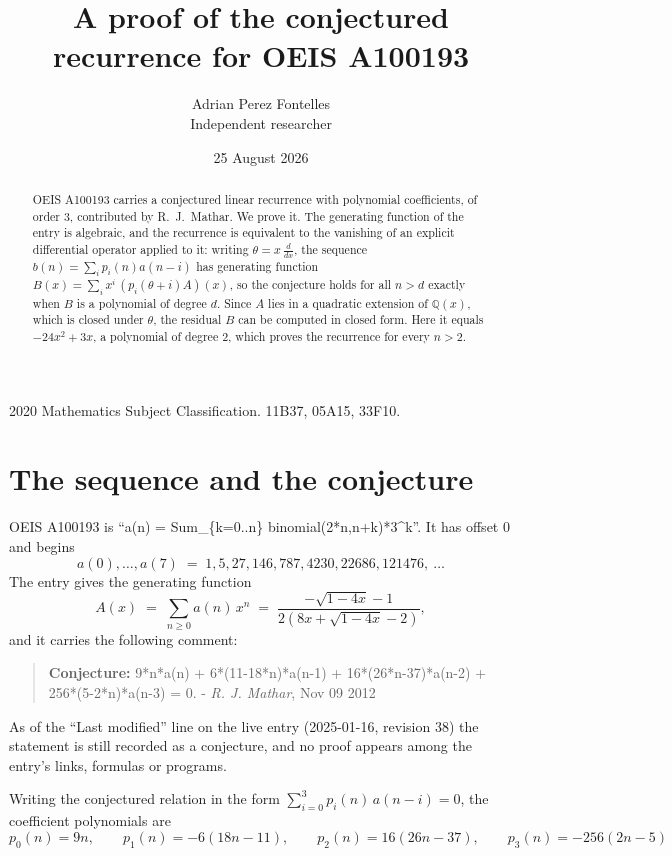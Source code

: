\documentclass[11pt,a4paper]{article}
\title{A proof of the conjectured recurrence for OEIS A100193}
\author{Adrian Perez Fontelles\\ \small Independent researcher}
\date{25 August 2026}
\theoremstyle{plain}
\theoremstyle{definition}
\begin{document}
\maketitle

\begin{abstract}
OEIS A100193 carries a conjectured linear recurrence with polynomial coefficients, of
order 3, contributed by R.~J.~Mathar. We prove it. The generating function of the
entry is algebraic, and the recurrence is equivalent to the vanishing of an explicit
differential operator applied to it: writing $\theta=x\,\frac{d}{dx}$, the sequence
$b(n)=\sum_{i}p_{i}(n)a(n-i)$ has generating function
$B(x)=\sum_{i}x^{i}\,(p_{i}(\theta+i)A)(x)$, so the conjecture holds for all $n>d$ exactly
when $B$ is a polynomial of degree $d$. Since $A$ lies in a quadratic extension of
$\mathbb{Q}(x)$, which is closed under $\theta$, the residual $B$ can be computed in
closed form. Here it equals $- 24 x^{2} + 3 x$, a polynomial of degree $2$, which proves
the recurrence for every $n>2$.
\end{abstract}

\noindent\small 2020 Mathematics Subject Classification. 11B37, 05A15, 33F10.\normalsize

\section{The sequence and the conjecture}

OEIS A100193 is ``a(n) = Sum\_\{k=0..n\} binomial(2*n,n+k)*3\^{}k''. It has offset $0$ and begins
\[
a(0),\dots,a(7)\;=\;1, 5, 27, 146, 787, 4230, 22686, 121476,\ \dots
\]
The entry gives the generating function
\begin{equation}\label{eq:gf}
A(x)\;=\;\sum_{n\ge 0} a(n)\,x^{n}\;=\;\frac{- \sqrt{1 - 4 x} - 1}{2 \left(8 x + \sqrt{1 - 4 x} - 2\right)} ,
\end{equation}
and it carries the following comment:
\begin{quote}\small
\textbf{Conjecture:} 9*n*a(n) + 6*(11-18*n)*a(n-1) + 16*(26*n-37)*a(n-2) + 256*(5-2*n)*a(n-3) = 0. - \emph{R. J. Mathar}, Nov 09 2012
\end{quote}
As of the ``Last modified'' line on the live entry (2025-01-16, revision 38) the
statement is still recorded as a conjecture, and no proof appears among the entry's links,
formulas or programs.

Writing the conjectured relation in the form $\sum_{i=0}^{3}p_{i}(n)\,a(n-i)=0$,
the coefficient polynomials are
\[
p_{0}(n)=9 n,\qquad p_{1}(n)=- 6 \left(18 n - 11\right),\qquad p_{2}(n)=16 \left(26 n - 37\right),\qquad p_{3}(n)=- 256 \left(2 n - 5\right)
\]
\end{document}
